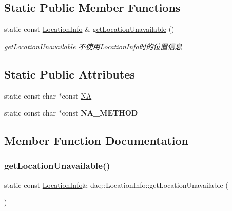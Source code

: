 \subsection*{Static Public Member Functions}
\begin{DoxyCompactItemize}
\item 
static const \hyperlink{classdaq_1_1LocationInfo}{Location\+Info} \& \hyperlink{classdaq_1_1LocationInfo_a3e1a9b86cb3b5f35accb70db5dc62ed4}{get\+Location\+Unavailable} ()
\begin{DoxyCompactList}\small\item\em get\+Location\+Unavailable 不使用\+Location\+Info时的位置信息 \end{DoxyCompactList}\end{DoxyCompactItemize}
\subsection*{Static Public Attributes}
\begin{DoxyCompactItemize}
\item 
static const char $\ast$const \hyperlink{classdaq_1_1LocationInfo_aea318a7eecc96e89ac2470810071111c}{NA}
\item 
\mbox{\label{classdaq_1_1LocationInfo_a9a9d0810de543046a08104e5135b6e91}} 
static const char $\ast$const {\bfseries N\+A\+\_\+\+M\+E\+T\+H\+OD}
\end{DoxyCompactItemize}


\subsection{Member Function Documentation}
\mbox{\label{classdaq_1_1LocationInfo_a3e1a9b86cb3b5f35accb70db5dc62ed4}} 
\subsubsection{\texorpdfstring{get\+Location\+Unavailable()}{getLocationUnavailable()}}
{\footnotesize\ttfamily static const \hyperlink{classdaq_1_1LocationInfo}{Location\+Info}\& daq\+::\+Location\+Info\+::get\+Location\+Unavailable (\begin{DoxyParamCaption}{ }\end{DoxyParamCaption})\hspace{0.3cm}{\ttfamily [static]}}



